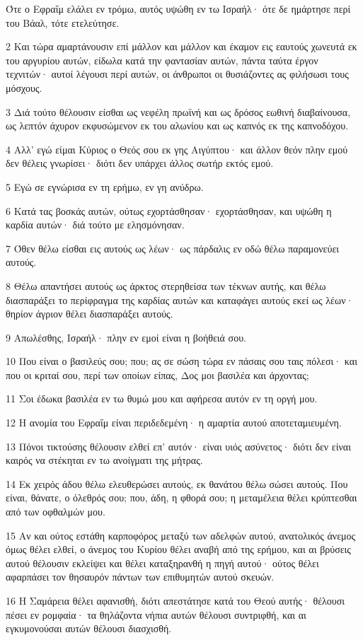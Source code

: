 \par Ότε ο Εφραΐμ ελάλει εν τρόμω, αυτός υψώθη εν τω Ισραήλ· ότε δε ημάρτησε περί του Βάαλ, τότε ετελεύτησε.
\par 2 Και τώρα αμαρτάνουσιν επί μάλλον και μάλλον και έκαμον εις εαυτούς χωνευτά εκ του αργυρίου αυτών, είδωλα κατά την φαντασίαν αυτών, πάντα ταύτα έργον τεχνιτών· αυτοί λέγουσι περί αυτών, οι άνθρωποι οι θυσιάζοντες ας φιλήσωσι τους μόσχους.
\par 3 Διά τούτο θέλουσιν είσθαι ως νεφέλη πρωϊνή και ως δρόσος εωθινή διαβαίνουσα, ως λεπτόν άχυρον εκφυσώμενον εκ του αλωνίου και ως καπνός εκ της καπνοδόχου.
\par 4 Αλλ' εγώ είμαι Κύριος ο Θεός σου εκ γης Αιγύπτου· και άλλον θεόν πλην εμού δεν θέλεις γνωρίσει· διότι δεν υπάρχει άλλος σωτήρ εκτός εμού.
\par 5 Εγώ σε εγνώρισα εν τη ερήμω, εν γη ανύδρω.
\par 6 Κατά τας βοσκάς αυτών, ούτως εχορτάσθησαν· εχορτάσθησαν, και υψώθη η καρδία αυτών· διά τούτο με ελησμόνησαν.
\par 7 Όθεν θέλω είσθαι εις αυτούς ως λέων· ως πάρδαλις εν οδώ θέλω παραμονεύει αυτούς.
\par 8 Θέλω απαντήσει αυτούς ως άρκτος στερηθείσα των τέκνων αυτής, και θέλω διασπαράξει το περίφραγμα της καρδίας αυτών και καταφάγει αυτούς εκεί ως λέων· θηρίον άγριον θέλει διασπαράξει αυτούς.
\par 9 Απωλέσθης, Ισραήλ· πλην εν εμοί είναι η βοήθειά σου.
\par 10 Που είναι ο βασιλεύς σου; που; ας σε σώση τώρα εν πάσαις σου ταις πόλεσι· και που οι κριταί σου, περί των οποίων είπας, Δος μοι βασιλέα και άρχοντας;
\par 11 Σοι έδωκα βασιλέα εν τω θυμώ μου και αφήρεσα αυτόν εν τη οργή μου.
\par 12 Η ανομία του Εφραΐμ είναι περιδεδεμένη· η αμαρτία αυτού αποτεταμιευμένη.
\par 13 Πόνοι τικτούσης θέλουσιν ελθεί επ' αυτόν· είναι υιός ασύνετος· διότι δεν είναι καιρός να στέκηται εν τω ανοίγματι της μήτρας.
\par 14 Εκ χειρός άδου θέλω ελευθερώσει αυτούς, εκ θανάτου θέλω σώσει αυτούς. Που είναι, θάνατε, ο όλεθρός σου; που, άδη, η φθορά σου; η μεταμέλεια θέλει κρύπτεσθαι από των οφθαλμών μου.
\par 15 Αν και ούτος εστάθη καρποφόρος μεταξύ των αδελφών αυτού, ανατολικός άνεμος όμως θέλει ελθεί, ο άνεμος του Κυρίου θέλει αναβή από της ερήμου, και αι βρύσεις αυτού θέλουσιν εκλείψει και θέλει καταξηρανθή η πηγή αυτού· ούτος θέλει αφαρπάσει τον θησαυρόν πάντων των επιθυμητών αυτού σκευών.
\par 16 Η Σαμάρεια θέλει αφανισθή, διότι απεστάτησε κατά του Θεού αυτής· θέλουσι πέσει εν ρομφαία· τα θηλάζοντα νήπια αυτών θέλουσι συντριφθή, και αι εγκυμονούσαι αυτών θέλουσι διασχισθή.

